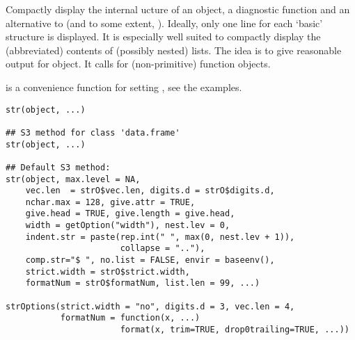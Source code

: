 %
\begin{Description}\relax
Compactly display the internal ucture of an \R{} object, a
diagnostic function and an alternative to 
(and to some extent, ).  Ideally, only one line for
each `basic' structure is displayed.  It is especially well suited
to compactly display the (abbreviated) contents of (possibly nested)
lists.  The idea is to give reasonable output for  \R{}
object.  It calls  for (non-primitive) function objects.

 is a convenience function for setting
, see the examples.
\end{Description}
%
\begin{Usage}
\begin{verbatim}
str(object, ...)

## S3 method for class 'data.frame'
str(object, ...)

## Default S3 method:
str(object, max.level = NA,
    vec.len  = strO$vec.len, digits.d = strO$digits.d,
    nchar.max = 128, give.attr = TRUE,
    give.head = TRUE, give.length = give.head,
    width = getOption("width"), nest.lev = 0,
    indent.str = paste(rep.int(" ", max(0, nest.lev + 1)),
                       collapse = ".."),
    comp.str="$ ", no.list = FALSE, envir = baseenv(),
    strict.width = strO$strict.width,
    formatNum = strO$formatNum, list.len = 99, ...)

strOptions(strict.width = "no", digits.d = 3, vec.len = 4,
           formatNum = function(x, ...)
                       format(x, trim=TRUE, drop0trailing=TRUE, ...))
\end{verbatim}
\end{Usage}
%
